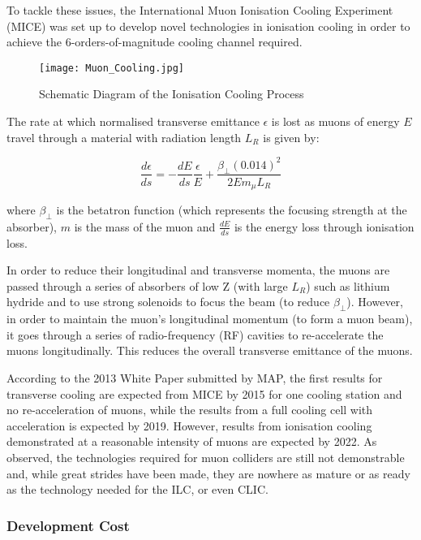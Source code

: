 To tackle these issues, the International Muon Ionisation Cooling Experiment (MICE) was set up to develop novel technologies in ionisation cooling in order to achieve the 6-orders-of-magnitude cooling channel required.
 
\begin{figure}[!htb]
\centering
\texttt{[image: Muon\_Cooling.jpg]}
\caption{Schematic Diagram of the Ionisation Cooling Process}
\end{figure}
 
The rate at which normalised transverse emittance $\epsilon$ is lost as muons of energy $E$ travel through a material with radiation length $L_R$ is given by:
 
\begin{equation}
    \frac{d \epsilon}{ds} = - \frac{dE}{ds} \frac{\epsilon}{E} + \frac{\beta_{\perp} (0.014)^2}{2 E m_{\mu} L_R}
\end{equation}
 
where $\beta_{\perp}$ is the betatron function (which represents the focusing strength at the absorber), $m$ is the mass of the muon and $\frac{dE}{ds}$ is the energy loss through ionisation loss. 

In order to reduce their longitudinal and transverse momenta, the muons are passed through a series of absorbers of low Z (with large $L_R$) such as lithium hydride and to use strong solenoids to focus the beam (to reduce $\beta_{\perp}$). However, in order to maintain the muon's longitudinal momentum (to form a muon beam), it goes through a series of radio-frequency (RF) cavities to re-accelerate the muons longitudinally. This reduces the overall transverse emittance of the muons.
 
According to the 2013 White Paper submitted by MAP, the first results for transverse cooling are expected from MICE by 2015 for one cooling station and no re-acceleration of muons, while the results from a full cooling cell with acceleration is expected by 2019. However, results from ionisation cooling demonstrated at a reasonable intensity of muons are expected by 2022. As observed, the technologies required for muon colliders are still not demonstrable and, while great strides have been made, they are nowhere as mature or as ready as the technology needed for the ILC, or even CLIC.
 
\subsubsection{Development Cost}
 
